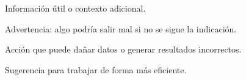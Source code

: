 \begin{nota}
Información útil o contexto adicional.
\end{nota}
\begin{aviso}
Advertencia: algo podría salir mal si no se sigue la indicación.
\end{aviso}
\begin{peligro}
Acción que puede dañar datos o generar resultados incorrectos.
\end{peligro}
\begin{tip}
Sugerencia para trabajar de forma más eficiente.
\end{tip}

